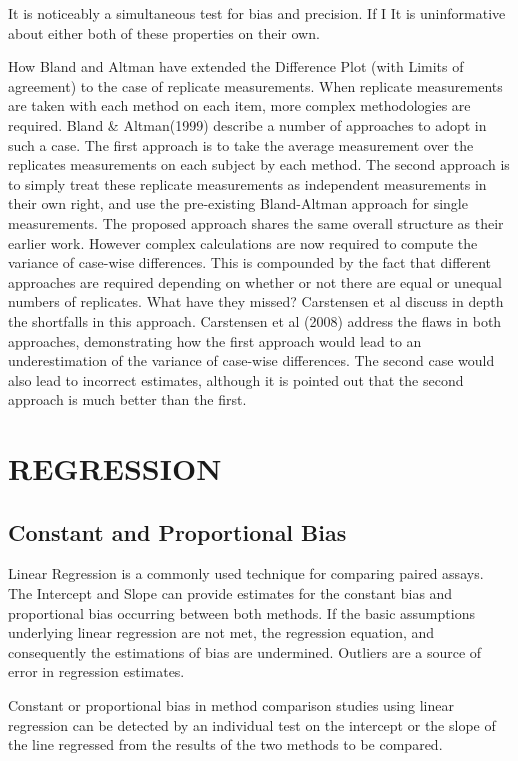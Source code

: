 \documentclass[12pt, a4paper]{report}
\theoremstyle{plain}
\theoremstyle{definition}
\theoremstyle{remark}
\begin{document}
It is noticeably a simultaneous test for bias and precision. If I It is uninformative about either both of these properties on their own.

\newpage
How Bland and Altman have extended the Difference Plot (with Limits of agreement) to the case of replicate measurements.
When replicate measurements are taken with each method on each item, more complex methodologies are required. Bland \& Altman(1999) describe a number of approaches to adopt in such a case. The first approach is to take the average measurement over the replicates measurements on each subject by each method.
The second approach is to simply treat these replicate measurements as independent measurements in their own right, and use the pre-existing Bland-Altman approach for single measurements.
The proposed approach shares the same overall structure as their earlier work. However complex calculations are now required to compute the variance of case-wise differences. This is compounded by the fact that different approaches are required depending on whether or not there are equal or unequal numbers of replicates.
What have they missed? Carstensen et al discuss in depth the shortfalls in this approach.
Carstensen et al (2008) address the flaws in both approaches, demonstrating how the first approach would lead to an underestimation of the variance of case-wise differences. The second case would also lead to incorrect estimates, although it is pointed out that the second approach is much better than the first.


\chapter{REGRESSION}%

\section{Constant and Proportional Bias}

Linear Regression is a commonly used technique for comparing paired assays. The Intercept and Slope can provide estimates for the constant bias and proportional bias occurring between both methods. If the basic assumptions underlying linear regression are not met, the regression equation, and consequently the estimations
of bias are undermined. Outliers are a source of error in regression estimates.

Constant or proportional bias in method comparison studies using linear regression can be detected by an individual test on the intercept or the slope of the line regressed from the results of the two methods to be compared.
\end{document}
